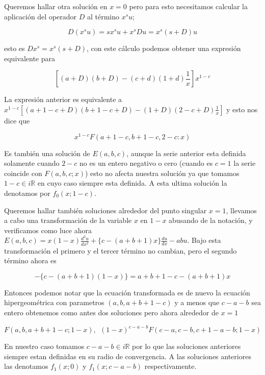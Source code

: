 \documentclass[12pt]{article}
\theoremstyle{definition}
\theoremstyle{remark}
\numberwithin{equation}{section}
\begin{document}
Queremos hallar otra soluci\'on en $x=0$ pero para esto necesitamos calcular la aplicaci\'on del operador $D$ al t\'ermino $x^{s} u$;

$$D(x^{s}u)= sx^{s}u + x^{s}Du = x^{s}(s +D)u$$

esto es $Dx^{s}= x^{s} (s + D)$, con este c\'alculo podemos obtener una expresi\'on equivalente para 

$$[(a+D)(b+D) - (c+d)(1+d) \frac{1}{x}] x^{1-c} $$

La expresi\'on anterior es equivalente a $x^{1-c}[(a+1-c+D)(b+1-c+D)-(1+D)(2-c+D)\frac{1}{x}]$ y esto nos dice que 

$$x^{1-c} F(a+1-c,b+1-c,2-c:x) $$

Es tambi\'en una soluci\'on de $E(a,b,c)$, aunque la serie anterior esta definida solamente cuando $2-c$ no es un entero negativo o cero (cuando es $c=1$ la serie  coincide con $F(a,b,c;x)$) esto no afecta nuestra soluci\'on ya que tomamos $1-c \in i\mathbb{R}$ en cuyo caso siempre esta definida. A esta ultima soluci\'on la denotamos por $f_{0}(x;1-c)$.

Queremos hallar tambi\'en soluciones alrededor del punto singular $x=1$, llevamos a cabo una transformaci\'on de la variable $x$ en $1-x$ abusando de la notaci\'on, y verificamos como luce ahora $E(a,b,c)=x(1-x) \frac{d^{2}u}{dx^{2}} + \lbrace c- (a+b+1)x \rbrace \frac{du}{dx} -abu$. Bajo esta transformaci\'on el primero y el tercer t\'ermino no cambian, pero el segundo t\'ermino ahora es 

$$-\lbrace  c- (a+b+1)(1-x)\rbrace = a+b+1-c-(a+b+1)x $$

Entonces podemos notar que la ecuaci\'on transformada es de nuevo la ecuaci\'on hipergeom\'etrica con parametros $ (a,b,a+b+1-c)$ y a menos que $c-a-b$ sea entero obtenemos como antes dos soluciones pero ahora alrededor de $x=1$

$$F(a,b,a+b+1-c;1-x), \ \ (1-x)^{c-a-b}F(c-a,c-b,c+1-a-b;1-x)$$

En nuestro caso tomamos $c-a-b \in i\mathbb{R} $ por lo que las soluciones anteriores siempre estan definidas en su radio de convergencia. A las soluciones anteriores las denotamos $f_{1}(x;0) $ y $f_{1}(x;c-a-b)$ respectivamente.
\end{document}
